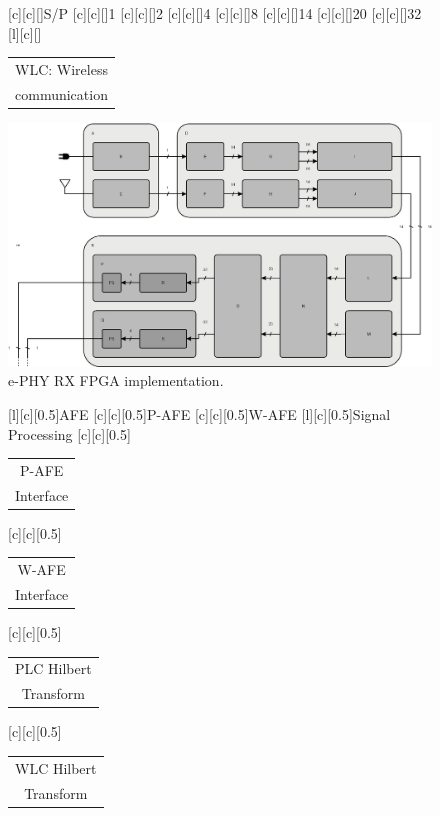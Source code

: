 \documentclass[mathserif]{beamer}
\begin{document}
\begin{frame}
\begin{overprint}
{\begin{figure}[htb]
				[c][c][\sizeLetter]{S/P}
				[c][c][\sizeLetter]{1}	
				[c][c][\sizeLetter]{2}	
				[c][c][\sizeLetter]{4}	
				[c][c][\sizeLetter]{8}	
				[c][c][\sizeLetter]{14}
				[c][c][\sizeLetter]{20}	
				[c][c][\sizeLetter]{32}	
				[l][c][\sizeLetter]{\begin{tabular}{c}
						WLC: Wireless\\communication
				\end{tabular}}	
				\includegraphics[width=0.9\linewidth]{figuras/phy_rx_cut1}
				\caption{e-PHY RX FPGA implementation.}
			\end{figure}
		}
		{
			\renewcommand{\sizeLetter}{0.5}
			\begin{figure}[htb]
				\centering
				[l][c][\sizeLetter]{AFE}
				[c][c][\sizeLetter]{P-AFE}
				[c][c][\sizeLetter]{W-AFE}
				[l][c][\sizeLetter]{Signal Processing}
				[c][c][\sizeLetter]{\begin{tabular}{c}
						P-AFE\\Interface
				\end{tabular}}
				[c][c][\sizeLetter]{\begin{tabular}{c}
						W-AFE\\Interface
				\end{tabular}}
				[c][c][\sizeLetter]{\begin{tabular}{c}
						PLC Hilbert\\Transform
				\end{tabular}}
				[c][c][\sizeLetter]{\begin{tabular}{c}
						WLC Hilbert\\Transform
				\end{tabular}}

\end{figure}}
\end{overprint}
\end{frame}
\end{document}
